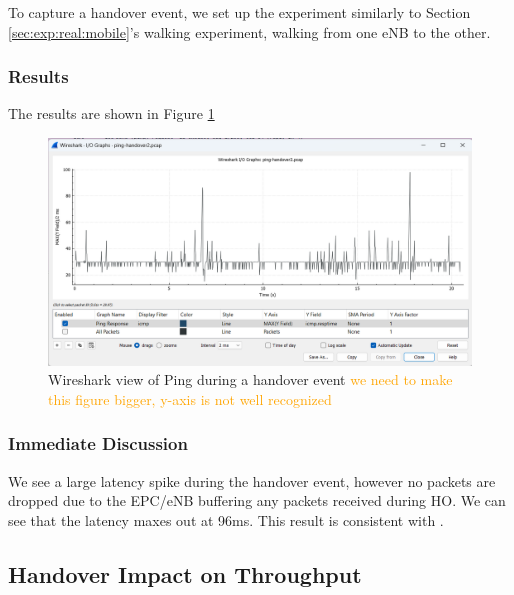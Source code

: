 
To capture a handover event, we set up the experiment similarly to Section \ref{sec:exp:real:mobile}'s walking experiment, walking from one eNB to the other.
\subsubsection{Results}
The results are shown in Figure \ref{fig:methods:ping-handover}
\begin{figure}
    \centering
    \includegraphics[width=0.75\linewidth]{src//img/ping-handover.png}
    \caption{Wireshark view of Ping during a handover event \textcolor{orange}{we need to make this figure bigger, y-axis is not well recognized}}
    \label{fig:methods:ping-handover}
\end{figure}
\subsubsection{Immediate Discussion}
We see a large latency spike during the handover event, however no packets are dropped due to the EPC/eNB buffering any packets received during HO. We can see that the latency maxes out at 96ms. This result is consistent with \citet{zhang_performance_2012}.

\subsection{Handover Impact on Throughput}

